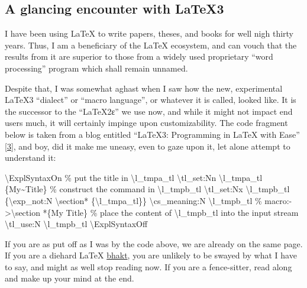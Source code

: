 \documentclass[
  a4paper,
]{article}
\newenvironment{Shaded}{\begin{snugshade}}{\end{snugshade}}
\newcommand{\CommentTok}[1]{\textcolor[rgb]{0.50,0.62,0.50}{#1}}
\newcommand{\FunctionTok}[1]{\textcolor[rgb]{0.94,0.94,0.56}{#1}}
\newcommand{\KeywordTok}[1]{\textcolor[rgb]{0.94,0.87,0.69}{#1}}
\newcommand{\NormalTok}[1]{\textcolor[rgb]{0.80,0.80,0.80}{#1}}
\begin{document}
\hypertarget{a-glancing-encounter-with-latex3}{%
\subsection{A glancing encounter with
LaTeX3}\label{a-glancing-encounter-with-latex3}}

I have been using LaTeX to write papers, theses, and books for well nigh
thirty years. Thus, I am a beneficiary of the LaTeX ecosystem, and can
vouch that the results from it are superior to those from a widely used
proprietary ``word processing'' program which shall remain unnamed.

Despite that, I was somewhat aghast when I saw how the new, experimental
LaTeX3 ``dialect'' or ``macro language'', or whatever it is called,
looked like. It is the successor to the ``LaTeX2ɛ'' we use now, and
while it might not impact end users much, it will certainly impinge upon
customizability. The code fragment below is taken from a blog entitled
``LaTeX3: Programming in LaTeX with Ease''
{[}\protect\hyperlink{ref-xiang2020}{3}{]}, and boy, did it make me
uneasy, even to gaze upon it, let alone attempt to understand it:

\begin{Shaded}
\begin{Highlighting}[]
\FunctionTok{\textbackslash{}ExplSyntaxOn}
\CommentTok{\% put the title in \textbackslash{}l\_tmpa\_tl}
\FunctionTok{\textbackslash{}tl}\NormalTok{\_set:Nn }\FunctionTok{\textbackslash{}l}\NormalTok{\_tmpa\_tl \{My\textasciitilde{}Title\}}
\CommentTok{\% construct the command in \textbackslash{}l\_tmpb\_tl}
\FunctionTok{\textbackslash{}tl}\NormalTok{\_set:Nx }\FunctionTok{\textbackslash{}l}\NormalTok{\_tmpb\_tl \{}\FunctionTok{\textbackslash{}exp}\NormalTok{\_not:N }\KeywordTok{\textbackslash{}section*}\NormalTok{ \{}\FunctionTok{\textbackslash{}l}\NormalTok{\_tmpa\_tl\}\}}
\FunctionTok{\textbackslash{}cs}\NormalTok{\_meaning:N }\FunctionTok{\textbackslash{}l}\NormalTok{\_tmpb\_tl }\CommentTok{\% macro:{-}\textgreater{}\textbackslash{}section *\{My Title\}}
\CommentTok{\% place the content of \textbackslash{}l\_tmpb\_tl into the input stream}
\FunctionTok{\textbackslash{}tl}\NormalTok{\_use:N }\FunctionTok{\textbackslash{}l}\NormalTok{\_tmpb\_tl}
\FunctionTok{\textbackslash{}ExplSyntaxOff}
\end{Highlighting}
\end{Shaded}

If you are as put off as I was by the code above, we are already on the
same page. If you are a diehard LaTeX
\href{https://www.collinsdictionary.com/dictionary/hindi-english/\%E0\%A4\%AD\%E0\%A4\%95\%E0\%A5\%8D\%E0\%A4\%A4}{bhakt},
you are unlikely to be swayed by what I have to say, and might as well
stop reading now. If you are a fence-sitter, read along and make up your
mind at the end.
\end{document}
